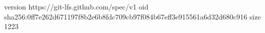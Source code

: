 version https://git-lfs.github.com/spec/v1
oid sha256:0ff7e262d671197f8b2e6b8fdc709cb97f084b67eff3e915561a6d32d680c916
size 1223
